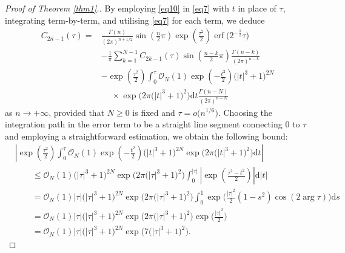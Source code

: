 \documentclass[11pt]{article}
\numberwithin{equation}{section}
\def\d{\mathrm{d}}
\def\erf{\operatorname{erf}}
\numberwithin{equation}{section}
\begin{document}
\begin{proof}[Proof of Theorem \ref{thm1}.] By employing \eqref{eq10} in \eqref{eq7} with $t$ in place of $\tau$, integrating term-by-term, and utilising \eqref{eq7} for each term, we deduce
\begin{align*}
C_{2n - 1} (\tau ) ={}& \frac{\Gamma (n)}{(2\pi )^{n + 1/2} }\sin \left( \frac{n}{2}\pi \right)\exp \left( \frac{\tau ^2}{2} \right)\erf\big( 2^{ - \frac{1}{2}} \tau \big) \\
&- \frac{1}{\pi}\sum_{k = 1}^{N - 1} C_{2k - 1} (\tau )\sin \left( \frac{n - k}{2}\pi \right)\frac{\Gamma (n - k)}{(2\pi )^{n - k} }
\\ & - \exp \left( \frac{\tau ^2}{2} \right)\int_0^\tau \mathcal{O}_N (1)\exp \left( - \frac{t^2}{2} \right)\bigl(\left| t \right|^3 + 1\bigr)^{2N} \\
&\phantom{-}{}\times\exp \big( 2\pi \bigl(\left| t \right|^3 + 1\bigr)^2 \big)\d t \frac{\Gamma (n - N)}{(2\pi )^{n - N}}
\end{align*}
as $n\to+\infty$, provided that $N\ge 0$ is fixed and $\tau = o\big(n^{1/6}\big)$. Choosing the integration path in the error term to be a straight line segment connecting $0$ to $\tau$ and employing a straightforward estimation, we obtain the following bound:
\begin{align*}
& \left| \exp \left( \frac{\tau ^2}{2} \right)\int_0^\tau \mathcal{O}_N (1)\exp \left( - \frac{t^2}{2} \right)\bigl(\left| t \right|^3 + 1\bigr)^{2N} \exp \big( 2\pi \bigl(\left| t \right|^3 + 1\bigr)^2 \big)\d t \right|
\\ &\qquad \le \mathcal{O}_N (1)\bigl(\left| \tau \right|^3 + 1\bigr)^{2N} \exp \big( 2\pi \bigl(\left| \tau \right|^3 + 1\bigr)^2 \big) \int_0^{\left| \tau \right|} \left| \exp \left( \frac{\tau ^2 - t^2}{2} \right) \right|\d\left| t \right|
\\ & \qquad= \mathcal{O}_N (1) \left| \tau \right|\bigl(\left| \tau \right|^3 + 1\bigr)^{2N} \exp \big( 2\pi \bigl(\left| \tau \right|^3 + 1\bigr)^2 \big) \int_0^1 \exp \bigg( \frac{\left| \tau \right|^2}{2}(1 - s^2 )\cos (2\arg \tau ) \bigg)\d s
\\ & \qquad= \mathcal{O}_N (1)\left| \tau \right|\bigl(\left| \tau \right|^3 + 1\bigr)^{2N} \exp \big( 2\pi \bigl(\left| \tau \right|^3 + 1\bigr)^2 \big)\exp \bigg( \frac{\left| \tau \right|^2}{2} \bigg)
\\ & \qquad= \mathcal{O}_N (1)\left| \tau \right|\bigl(\left| \tau \right|^3 + 1\bigr)^{2N} \exp \big( 7\bigl(\left| \tau \right|^3 + 1\bigr)^2 \big).
\end{align*}

\end{proof}
\end{document}
